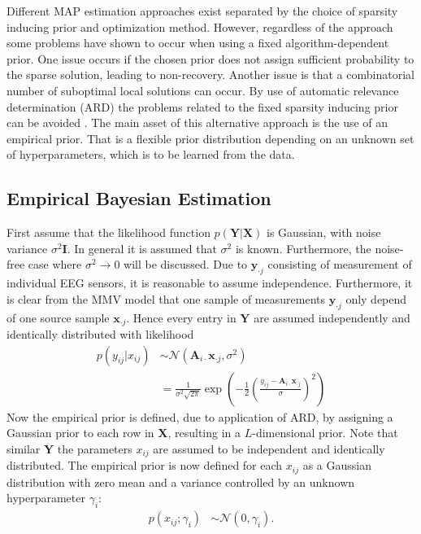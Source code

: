 Different MAP estimation approaches exist separated by the choice of sparsity inducing prior and optimization method. 
However, regardless of the approach some problems have shown to occur when using a fixed algorithm-dependent prior. 
One issue occurs if the chosen prior does not assign sufficient probability to the sparse solution, leading to non-recovery.
Another issue is that a combinatorial number of suboptimal local solutions can occur.
By use of automatic relevance determination (ARD) the problems related to the fixed sparsity inducing prior can be avoided \cite[p. 20]{phd_wipf}. 
The main asset of this alternative approach is the use of an empirical prior. 
That is a flexible prior distribution depending on an unknown set of hyperparameters, which is to be learned from the data.
 
\subsection{Empirical Bayesian Estimation}\label{seg:EBE}
First assume that the likelihood function $p(\mathbf{Y} \vert \mathbf{X})$ is Gaussian, with noise variance $\sigma^2\textbf{I}$. In general it is assumed that $\sigma^2$ is known. Furthermore, the noise-free case where $\sigma^2 \rightarrow 0$ will be discussed. 
Due to $\textbf{y}_{\cdot j}$ consisting of measurement of individual EEG sensors, it is reasonable to assume independence. Furthermore, it is clear from the MMV model that one sample of measurements $\textbf{y}_{\cdot j}$ only depend of one source sample $\textbf{x}_{\cdot j}$. Hence every entry in $\textbf{Y}$ are assumed independently and identically distributed with likelihood 
\begin{align*}
p(y_{ij}\vert x_{ij}) &\sim \mathcal{N}(\mathbf{A}_{i \cdot}\textbf{x}_{\cdot j}, \sigma^2) \\
& = \frac{1}{\sigma^2\sqrt{2\pi}}\exp\left( -\frac{1}{2}\left( \frac{y_{ij}- \mathbf{A}_{i \cdot}\textbf{x}_{\cdot j}}{\sigma}\right)^{2}\right)
\end{align*}
Now the empirical prior is defined, due to application of ARD, by assigning a Gaussian prior to each row in $\textbf{X}$, resulting in a $L$-dimensional prior. Note that similar $\textbf{Y}$ the parameters $x_{ij}$ are assumed to be independent and identically distributed.
The empirical prior is now defined for each $x_{ij}$ as a Gaussian distribution with zero mean and a variance controlled by an unknown hyperparameter $\gamma_i$:
\begin{align*}
p (x_{i j} ; \gamma_i) &\sim \mathcal{N}(0, \gamma_i).
\end{align*}
